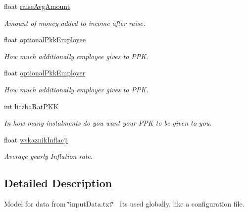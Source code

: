 \begin{DoxyCompactItemize}
\mbox{\label{structinputData_ac67ada093c252c57b240ec3147188dc0}} 
float \mbox{\hyperlink{structinputData_ac67ada093c252c57b240ec3147188dc0}{raise\+Avg\+Amount}}
\begin{DoxyCompactList}\small\item\em Amount of money added to income after raise. \end{DoxyCompactList}\item 
\mbox{\label{structinputData_ad4e370d94d390967c0ee0f317b06bedd}} 
float \mbox{\hyperlink{structinputData_ad4e370d94d390967c0ee0f317b06bedd}{optional\+Pkk\+Employee}}
\begin{DoxyCompactList}\small\item\em How much additionally employee gives to P\+PK. \end{DoxyCompactList}\item 
\mbox{\label{structinputData_a626ffc3b5f1b31cf07b7a6c208d40105}} 
float \mbox{\hyperlink{structinputData_a626ffc3b5f1b31cf07b7a6c208d40105}{optional\+Pkk\+Employer}}
\begin{DoxyCompactList}\small\item\em How much additionally employer gives to P\+PK. \end{DoxyCompactList}\item 
\mbox{\label{structinputData_a11e82ead29fcba044f6e1e2692e4f28e}} 
int \mbox{\hyperlink{structinputData_a11e82ead29fcba044f6e1e2692e4f28e}{liczba\+Rat\+P\+KK}}
\begin{DoxyCompactList}\small\item\em In how many instalments do you want your P\+PK to be given to you. \end{DoxyCompactList}\item 
\mbox{\label{structinputData_a799ecfb80b5281f469e192efbf476b8c}} 
float \mbox{\hyperlink{structinputData_a799ecfb80b5281f469e192efbf476b8c}{wskaznik\+Inflacji}}
\begin{DoxyCompactList}\small\item\em Average yearly Inflation rate. \end{DoxyCompactList}\end{DoxyCompactItemize}


\subsection{Detailed Description}
Model for data from \char`\"{}input\+Data.\+txt\char`\"{}~\newline
 It\textquotesingle{}s used globally, like a configuration file. 

